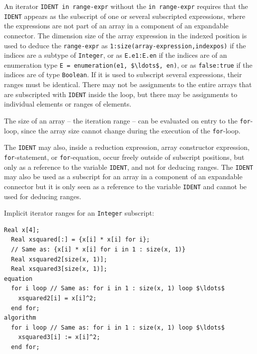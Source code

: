 An iterator \lstinline!IDENT in range-expr! without the \lstinline!in range-expr! requires that the \lstinline!IDENT! appears as the subscript of one or several subscripted expressions, where the expressions are not part of an array in a component of an expandable connector.
The dimension size of the array expression in the indexed position is used to deduce the \lstinline!range-expr! as \lstinline!1:size(array-expression,indexpos)! if the indices are a subtype of \lstinline!Integer!, or as \lstinline!E.e1:E.en! if the indices are of an enumeration type \lstinline!E = enumeration(e1, $\ldots$, en)!, or as \lstinline!false:true! if the indices are of type \lstinline!Boolean!.
If it is used to subscript several expressions, their ranges must be identical.
There may not be assignments to the entire arrays that are subscripted with \lstinline!IDENT! inside the loop, but there may be assignments to individual elements or ranges of elements.

\begin{nonnormative}
The size of an array -- the iteration range -- can be evaluated on entry to the \lstinline!for!-loop, since the array size cannot change during the execution of the \lstinline!for!-loop.
\end{nonnormative}

The \lstinline!IDENT! may also, inside a reduction expression, array constructor expression, \lstinline!for!-statement, or \lstinline!for!-equation, occur freely outside of subscript positions, but only as a reference to the variable \lstinline!IDENT!, and not for deducing ranges.
The \lstinline!IDENT! may also be used as a subscript for an array in a component of an expandable connector but it is only seen as a reference to the variable \lstinline!IDENT! and cannot be used for deducing ranges.

\begin{example}
Implicit iterator ranges for an \lstinline!Integer! subscript:
\begin{lstlisting}[language=modelica]
  Real x[4];
  Real xsquared[:] = {x[i] * x[i] for i};
  // Same as: {x[i] * x[i] for i in 1 : size(x, 1)}
  Real xsquared2[size(x, 1)];
  Real xsquared3[size(x, 1)];
equation
  for i loop // Same as: for i in 1 : size(x, 1) loop $\ldots$
    xsquared2[i] = x[i]^2;
  end for;
algorithm
  for i loop // Same as: for i in 1 : size(x, 1) loop $\ldots$
    xsquared3[i] := x[i]^2;
  end for;
\end{lstlisting}
\end{example}


